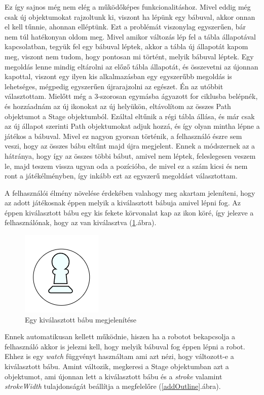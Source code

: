 \documentclass[a4paper,twoside]{article}
\begin{document}
Ez így sajnos még nem elég a működőképes funkcionalitáshoz. Mivel eddig még csak új objektumokat rajzoltunk ki, viszont ha lépünk egy bábuval, akkor onnan el kell tűnnie, ahonnan elléptünk. Ezt a problémát viszonylag egyszerűen, bár nem túl hatékonyan oldom meg. Mivel amikor változás lép fel a tábla állapotával kapcsolatban, tegyük fel egy bábuval léptek, akkor a tábla új állapotát kapom meg, viszont nem tudom, hogy pontosan mi történt, melyik bábuval léptek. Egy megoldás lenne mindig eltárolni az előző tábla állapotát, és összevetni az újonnan kapottal, viszont egy ilyen kis alkalmazásban egy egyszerűbb megoldás is lehetséges, mégpedig egyszerűen újrarajzolni az egészet. Én az utóbbit választottam. Mielőtt még a 3-szorosan egymásba ágyazott for ciklusba belépnék, és hozzáadnám az új ikonokat az új helyükön, eltávolítom az összes Path objektumot a Stage objektumból. Ezáltal eltűnik a régi tábla állása, és már csak az új állapot szerinti Path objektumokat adjuk hozzá, és így olyan mintha lépne a játékos a bábuval. Mivel ez nagyon gyorsan történik, a felhasználó észre sem veszi, hogy az összes bábu eltűnt majd újra megjelent. Ennek a módszernek az a hátránya, hogy így az összes többi bábut, amivel nem léptek, feleslegesen veszem le, majd teszem vissza ugyan oda a pozícióba, de mivel ez a szám kicsi és nem ront a játékélményben, így inkább ezt az egyszerű megoldást választottam. 

A felhasználói élmény növelése érdekében valahogy meg akartam jeleníteni, hogy az adott játékosnak éppen melyik a kiválasztott bábuja amivel lépni fog. Az éppen kiválasztott bábu egy kis fekete körvonalat kap az ikon köré, így jelezve a felhasználónak, hogy az van kiválasztva (\ref{babu}.ábra).
\begin{figure}
	\caption{Egy kiválasztott bábu megjelenítése}
	\label{babu}
	\centering
	\includegraphics[scale=0.5]{babu}
\end{figure}
\FloatBarrier

 Ennek automatikusan kellett működnie, hiszen ha a robotot bekapcsolja a felhasználó akkor is jelezni kell, hogy melyik bábuval fog éppen lépni a robot. Ehhez is egy \textit{watch} függvényt használtam ami azt nézi, hogy változott-e  a kiválasztott bábu. Amint változik, megkeresi a Stage objektumban azt a objektumot, ami újonnan lett a kiválasztott bábu és a \textit{stroke} valamint \textit{strokeWidth} tulajdonságát beállítja a megfelelőre (\ref{addOutline}.ábra).
\end{document}
